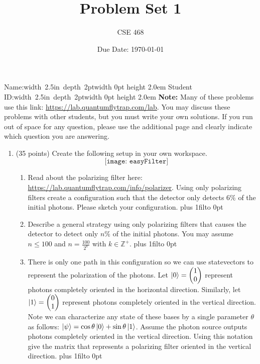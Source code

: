 \documentclass[12pt]{article}
\title{Problem Set 1}
\author{CSE 468}
\date{Due Date: \today}
\newcommand{\NameBlank}{\mbox{\hskip 4pt\vrule width 2.5in depth 2pt}\vrule width 0pt height 2.0em}
\def\DefaultSpace{1in}
\newcommand{\LeaveSpace}[1][\DefaultSpace]{%
\vskip #1 plus 1fil\relax\hbox to 0pt{\hss} %
}
\begin{document}
\maketitle

\noindent Name:\NameBlank{} \newline
\noindent Student ID:\NameBlank{} \newline
\newline
\noindent \textbf{Note:} Many of these problems use this link: \href{https://lab.quantumflytrap.com/lab}{https://lab.quantumflytrap.com/lab}.
You may discuss these problems with other students, but you must write your own solutions. If you run out of space for any question, please use the additional page and clearly indicate which question you are answering.

\begin{enumerate}[font=\bfseries]
    \item (35 points) Create the following setup in your own workspace.\\
    \[\texttt{[image: easyFilter]}\]
    \begin{enumerate}
        \item Read about the polarizing filter here: \\ \href{https://lab.quantumflytrap.com/info/polarizer}{https://lab.quantumflytrap.com/info/polarizer}. Using only polarizing filters create a configuration such that the detector only detects 6$\%$ of the initial photons. Please sketch your configuration.\LeaveSpace{}
        \item Describe a general strategy using only polarizing filters that causes the detector to detect only $n\%$ of the initial photons. You may assume $n \leq 100$ and $n = \frac{100}{2^k}$ with $k\in\mathbb{Z}^+$.\LeaveSpace[2.0in]
        \item There is only one path in this configuration so we can use statevectors to represent the polarization of the photons. Let $\ket{0} = \begin{pmatrix}1 \\ 0 \end{pmatrix}$ represent photons completely oriented in the horizontal direction. Similarly, let $\ket{1} = \begin{pmatrix}0 \\ 1 \end{pmatrix}$ represent photons completely oriented in the vertical direction. Note we can characterize any state of these bases by a single parameter $\theta$ as follows: $\ket{\psi} = \cos{\theta}\ket{0} + \sin{\theta}\ket{1}$. Assume the photon source outputs photons completely oriented in the vertical direction. Using this notation give the matrix that represents a polarizing filter oriented in the vertical direction.\LeaveSpace[1.5in]

\end{enumerate}
\end{enumerate}
\end{document}
